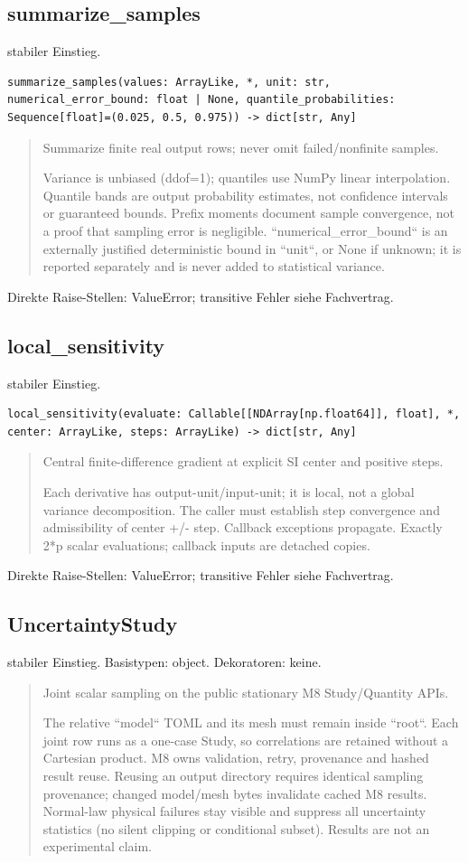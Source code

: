 \subsection{summarize\_samples}
stabiler Einstieg.
\begin{lstlisting}
summarize_samples(values: ArrayLike, *, unit: str, numerical_error_bound: float | None, quantile_probabilities: Sequence[float]=(0.025, 0.5, 0.975)) -> dict[str, Any]
\end{lstlisting}
\begin{quote}
Summarize finite real output rows; never omit failed/nonfinite samples.\par Variance is unbiased (ddof=1); quantiles use NumPy linear interpolation. Quantile bands are output probability estimates, not confidence intervals or guaranteed bounds. Prefix moments document sample convergence, not a proof that sampling error is negligible. ``numerical\_error\_bound`` is an externally justified deterministic bound in ``unit``, or None if unknown; it is reported separately and is never added to statistical variance.
\end{quote}
Direkte Raise-Stellen: ValueError; transitive Fehler siehe Fachvertrag.
\subsection{local\_sensitivity}
stabiler Einstieg.
\begin{lstlisting}
local_sensitivity(evaluate: Callable[[NDArray[np.float64]], float], *, center: ArrayLike, steps: ArrayLike) -> dict[str, Any]
\end{lstlisting}
\begin{quote}
Central finite-difference gradient at explicit SI center and positive steps.\par Each derivative has output-unit/input-unit; it is local, not a global variance decomposition. The caller must establish step convergence and admissibility of center +/- step. Callback exceptions propagate. Exactly 2*p scalar evaluations; callback inputs are detached copies.
\end{quote}
Direkte Raise-Stellen: ValueError; transitive Fehler siehe Fachvertrag.
\subsection{UncertaintyStudy}
stabiler Einstieg.
Basistypen: object. Dekoratoren: keine.
\begin{quote}
Joint scalar sampling on the public stationary M8 Study/Quantity APIs.\par The relative ``model`` TOML and its mesh must remain inside ``root``. Each joint row runs as a one-case Study, so correlations are retained without a Cartesian product. M8 owns validation, retry, provenance and hashed result reuse. Reusing an output directory requires identical sampling provenance; changed model/mesh bytes invalidate cached M8 results. Normal-law physical failures stay visible and suppress all uncertainty statistics (no silent clipping or conditional subset). Results are not an experimental claim.
\end{quote}
